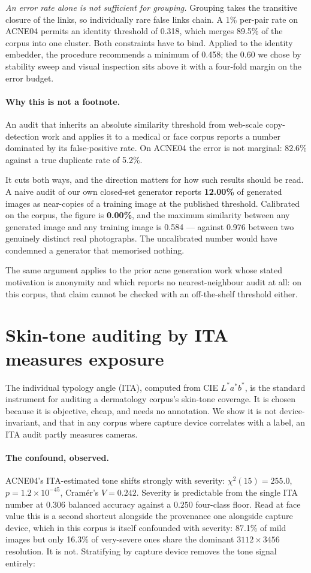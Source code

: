 \documentclass[11pt]{article}
\begin{document}
\emph{An error rate alone is not sufficient for grouping.} Grouping takes the transitive
closure of the links, so individually rare false links chain. A 1\% per-pair rate on ACNE04
permits an identity threshold of 0.318, which merges 89.5\% of the corpus into one cluster.
Both constraints have to bind. Applied to the identity embedder, the procedure recommends a
minimum of 0.458; the 0.60 we chose by stability sweep and visual inspection sits above it
with a four-fold margin on the error budget.

\paragraph{Why this is not a footnote.}
An audit that inherits an absolute similarity threshold from web-scale copy-detection work
and applies it to a medical or face corpus reports a number dominated by its false-positive
rate. On ACNE04 the error is not marginal: 82.6\% against a true duplicate rate of 5.2\%.

It cuts both ways, and the direction matters for how such results should be read. A naive
audit of our own closed-set generator reports \textbf{12.00\%} of generated images as
near-copies of a training image at the published threshold. Calibrated on the corpus, the
figure is \textbf{0.00\%}, and the maximum similarity between any generated image and any
training image is 0.584 --- against 0.976 between two genuinely distinct real photographs.
The uncalibrated number would have condemned a generator that memorised nothing.

The same argument applies to the prior acne generation work whose stated motivation
is anonymity and which reports no nearest-neighbour audit at all: on this corpus, that
claim cannot be checked with an off-the-shelf threshold either.

\section{Skin-tone auditing by ITA measures exposure}
\label{sec:ita}

The individual typology angle (ITA), computed from CIE $L^*a^*b^*$, is the standard
instrument for auditing a dermatology corpus's skin-tone coverage. It is chosen because it
is objective, cheap, and needs no annotation. We show it is not device-invariant, and that
in any corpus where capture device correlates with a label, an ITA audit partly measures
cameras.

\paragraph{The confound, observed.} ACNE04's ITA-estimated tone shifts strongly with
severity: $\chi^2(15)=255.0$, $p=1.2\times10^{-45}$, Cram\'er's $V=0.242$. Severity is
predictable from the single ITA number at $0.306$ balanced accuracy against a $0.250$
four-class floor. Read at face value this is a second shortcut alongside the provenance one
alongside capture device, which in this corpus is itself confounded with severity:
87.1\% of mild images but only 16.3\% of very-severe ones share the dominant
$3112\times3456$ resolution. It is not. Stratifying by capture device removes the tone
signal entirely:
\end{document}
